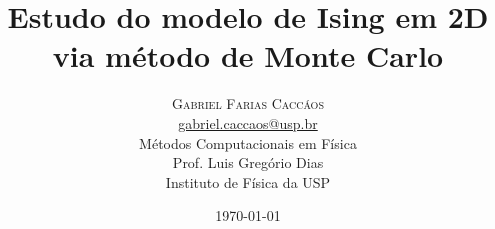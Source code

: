 \title{Estudo do modelo de Ising em 2D via método de Monte Carlo}
\author{%
	\textsc{Gabriel Farias Caccáos} \\[1ex]
	\normalsize \href{mailto:gabriel.caccaos@usp.br}{gabriel.caccaos@usp.br} \\[1ex]
	\normalsize Métodos Computacionais em Física \\
	\normalsize Prof. Luis Gregório Dias \\
	\normalsize Instituto de Física da USP \\
}
\date{\today}
